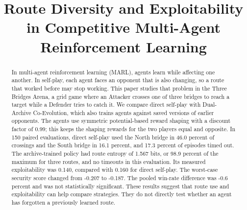 \documentclass[conference]{IEEEtran}
\begin{document}
\title{Route Diversity and Exploitability in Competitive Multi-Agent Reinforcement Learning}

\author{
\and
{}
\and
{}
\and
{}
}

\maketitle

\begin{abstract}
In multi-agent reinforcement learning (MARL), agents learn while affecting one another. In self-play, each agent faces an opponent that is also changing, so a route that worked before may stop working. This paper studies that problem in the Three Bridges Arena, a grid game where an Attacker crosses one of three bridges to reach a target while a Defender tries to catch it. We compare direct self-play with Dual-Archive Co-Evolution, which also trains agents against saved versions of earlier opponents. The agents use symmetric potential-based reward shaping with a discount factor of 0.99; this keeps the shaping rewards for the two players equal and opposite. In 150 paired evaluations, direct self-play used the North bridge in 46.0 percent of crossings and the South bridge in 16.1 percent, and 17.3 percent of episodes timed out. The archive-trained policy had route entropy of 1.567 bits, or 98.9 percent of the maximum for three routes, and no timeouts in this evaluation. Its measured exploitability was 0.140, compared with 0.160 for direct self-play. The worst-case security score changed from -0.207 to -0.187. The pooled win-rate difference was -0.6 percent and was not statistically significant. These results suggest that route use and exploitability can help compare strategies. They do not directly test whether an agent has forgotten a previously learned route.
\end{abstract}
\end{document}
